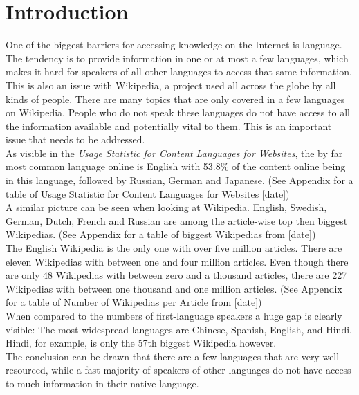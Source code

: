 \chapter{Introduction}

One of the biggest barriers for accessing knowledge on the Internet is language. The tendency is to provide information in one or at most a few languages, which makes it hard for speakers of all other languages to access that same information. This is also an issue with Wikipedia, a project used all across the globe by all kinds of people. There are many topics that are only covered in a few languages on Wikipedia. People who do not speak these languages do not have access to all the information available and potentially vital to them. This is an important issue that needs to be addressed. \\
As visible in the \textit{Usage Statistic for Content Languages for Websites}, the by far most common language online is English with 53.8\% of the content online being in this language, followed by Russian, German and Japanese. (See Appendix for a table of Usage Statistic for Content Languages for Websites [date]) \\
A similar picture can be seen when looking at Wikipedia. English, Swedish, German, Dutch, French and Russian are among the article-wise top then biggest Wikipedias. (See Appendix for a table of biggest Wikipedias from [date]) \\
The English Wikipedia is the only one with over five million articles. There are eleven Wikipedias with between one and four million articles. Even though there are only 48 Wikipedias with between zero and a thousand articles, there are 227 Wikipedias with between one thousand and one million articles. (See Appendix for a table of Number of Wikipedias per Article from [date]) \\
When compared to the numbers of first-language speakers a huge gap is clearly visible: The most widespread languages are Chinese, Spanish, English, and Hindi. Hindi, for example, is only the 57th biggest Wikipedia however. \\
The conclusion can be drawn that there are a few languages that are very well resourced, while a fast majority of speakers of other languages do not have access to much information in their native language.  \\
\\
